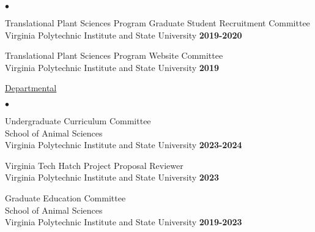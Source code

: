 \documentclass[margin,line,10pt]{res}
\newenvironment{list2}{
  \begin{list}{$\bullet$}{%
      \setlength{\itemsep}{0in}
      \setlength{\parsep}{0in} \setlength{\parskip}{0in}
      \setlength{\topsep}{0in} \setlength{\partopsep}{0in} 
      \setlength{\leftmargin}{0.2in}}}{\end{list}}
\begin{document}
\begin{resume}
\begin{list2}
  \vspace{0.3cm}


  \item Translational Plant Sciences Program Graduate Student Recruitment Committee \\
  Virginia Polytechnic Institute and State University  \hfill \textbf{2019-2020}\\

  \vspace{0.3cm}
  
\item Translational Plant Sciences Program Website Committee \\
  Virginia Polytechnic Institute and State University  \hfill \textbf{2019}\\

  
\end{list2}

  



  

\begin{flushleft}
  \hspace{0.3cm} \underline{Departmental}
\end{flushleft}
\begin{list2}

  \item Undergraduate Curriculum Committee \\
  School of Animal Sciences \\ Virginia Polytechnic Institute and State University   \hfill \textbf{2023-2024}\\

  \vspace{0.3cm}

  \item  Virginia Tech Hatch Project Proposal Reviewer \\
  Virginia Polytechnic Institute and State University  \hfill \textbf{2023}  \\

  \vspace{0.3cm}


  \item Graduate Education Committee \\
  School of Animal Sciences \\ Virginia Polytechnic Institute and State University   \hfill \textbf{2019-2023}\\


\end{list2}
\end{resume}
\end{document}
